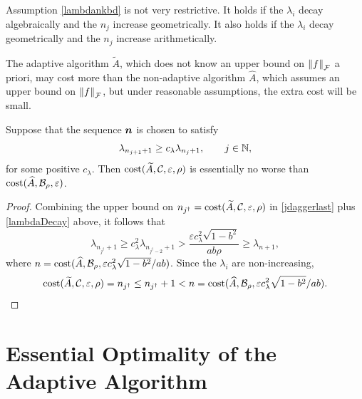 \documentclass[graybox,footinfo]{svmult}
\newcommand{\DHJRnorm}[2][{}]{\ensuremath{\left \lVert #2 \right \rVert}_{#1}}
\begin{document}
Assumption \eqref{lambdankbd} is not very restrictive.  It holds if the $\lambda_i$ decay algebraically and the $n_j$ increase geometrically.  It also holds if the $\lambda_i$ decay geometrically and the $n_j$ increase arithmetically.

The adaptive algorithm $\widetilde{A}$, which does not know an upper bound on $\DHJRnorm[\calF]{f}$ a priori, may cost more than the non-adaptive algorithm $\widehat{A}$, which assumes an upper bound on $\DHJRnorm[\calF]{f}$, but under reasonable assumptions, the extra cost will be small.

\begin{corollary} \label{cor:tAsameCosthA} Suppose that the sequence ${\boldsymbol{n}}$ is chosen to satisfy
\begin{equation} \label{lambdaDecay}
\lambda_{n_{j+1}+1} \ge c_\lambda \lambda_{n_j+1}, \qquad j \in \bbN, 
\end{equation}
for some positive $c_\lambda$.  Then $\textup{cost}(\widetilde{A},{\mathcal{C}}, \varepsilon,\rho)$ is essentially no worse than \linebreak[4]
$\textup{cost}(\widehat{A},{\mathcal{B}}_{\rho},\varepsilon)$. 


\end{corollary}

\begin{proof}
Combining the upper bound on $n_{j^\dagger} = \textup{cost}(\widetilde{A},{\mathcal{C}},\varepsilon,\rho)$ in \eqref{jdaggerlast} plus  \eqref{lambdaDecay} above, it follows that
\begin{equation*}
\lambda_{n_{j^\dagger}+1} \ge c_{\lambda}^2 \lambda_{n_{j^\dagger-2}+1} > \frac{\varepsilon c_{\lambda}^2\sqrt{1 - b^2}}{ab \rho} \ge \lambda_{n+1},
\end{equation*}
where $n = \textup{cost}(\widehat{A},{\mathcal{B}}_{\rho},\varepsilon c_{\lambda}^2\sqrt{1 - b^2}/ab)$.
Since the $\lambda_i$ are non-increasing,
\begin{equation*}
\textup{cost}(\widetilde{A},{\mathcal{C}},\varepsilon,\rho) = n_{j^\dagger} \le n_{j^\dagger}+1 < n = \textup{cost}(\widehat{A},{\mathcal{B}}_{\rho},\varepsilon c_{\lambda}^2\sqrt{1 - b^2}/ab).
\end{equation*}
\end{proof}

\section{Essential Optimality of the Adaptive Algorithm} \label{sec:opt}
\end{document}
